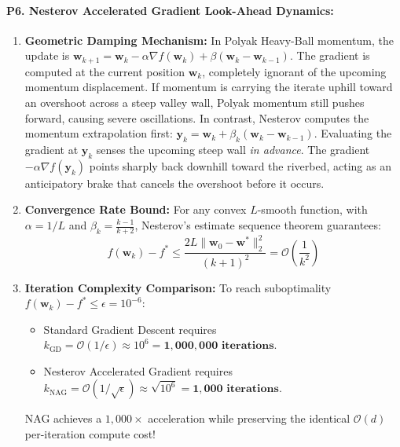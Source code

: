 \paragraph{P6. Nesterov Accelerated Gradient Look-Ahead Dynamics:}
\begin{enumerate}[label=(\alph*)]
    \item \textbf{Geometric Damping Mechanism:} In Polyak Heavy-Ball momentum, the update is $\mathbf{w}_{k+1} = \mathbf{w}_k - \alpha \nabla f(\mathbf{w}_k) + \beta(\mathbf{w}_k - \mathbf{w}_{k-1})$. The gradient is computed at the current position $\mathbf{w}_k$, completely ignorant of the upcoming momentum displacement. If momentum is carrying the iterate uphill toward an overshoot across a steep valley wall, Polyak momentum still pushes forward, causing severe oscillations.
    In contrast, Nesterov computes the momentum extrapolation first: $\mathbf{y}_k = \mathbf{w}_k + \beta_k(\mathbf{w}_k - \mathbf{w}_{k-1})$. Evaluating the gradient at $\mathbf{y}_k$ senses the upcoming steep wall \emph{in advance}. The gradient $-\alpha \nabla f(\mathbf{y}_k)$ points sharply back downhill toward the riverbed, acting as an anticipatory brake that cancels the overshoot before it occurs.

    \item \textbf{Convergence Rate Bound:} For any convex $L$-smooth function, with $\alpha = 1/L$ and $\beta_k = \frac{k-1}{k+2}$, Nesterov's estimate sequence theorem guarantees:
    \begin{equation*}
    f(\mathbf{w}_k) - f^* \le \frac{2 L \|\mathbf{w}_0 - \mathbf{w}^*\|_2^2}{(k + 1)^2} = \mathcal{O}\left( \frac{1}{k^2} \right)
    \end{equation*}

    \item \textbf{Iteration Complexity Comparison:}
    To reach suboptimality $f(\mathbf{w}_k) - f^* \le \epsilon = 10^{-6}$:
    \begin{itemize}
        \item Standard Gradient Descent requires $k_{\text{GD}} = \mathcal{O}(1/\epsilon) \approx 10^6 = \mathbf{1{,}000{,}000\text{ iterations}}$.
        \item Nesterov Accelerated Gradient requires $k_{\text{NAG}} = \mathcal{O}(1/\sqrt{\epsilon}) \approx \sqrt{10^6} = \mathbf{1{,}000\text{ iterations}}$.
    \end{itemize}
    NAG achieves a $1{,}000\times$ acceleration while preserving the identical $\mathcal{O}(d)$ per-iteration compute cost!
\end{enumerate}

